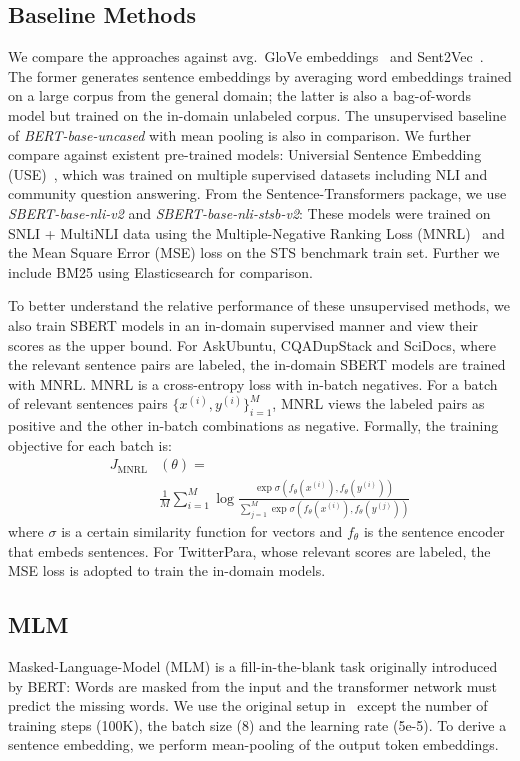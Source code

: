 \documentclass[11pt]{article}
\begin{document}
\subsection{Baseline Methods}
\label{sec:baseline_methods}
We compare the approaches against avg.\ GloVe embeddings~\citep{pennington2014glove} and Sent2Vec~\citep{DBLP:conf/naacl/PagliardiniGJ18}. The former generates sentence embeddings by averaging word embeddings trained on a large corpus from the general domain; the latter is also a bag-of-words model but trained on the in-domain unlabeled corpus. The unsupervised baseline of \textit{BERT-base-uncased} with mean pooling is also in comparison. We further compare against existent pre-trained models: Universial Sentence Embedding (USE)~\citep{DBLP:conf/acl/YangCAGLCAYTSSK20}, which was trained on multiple supervised datasets including NLI and community question answering. From the Sentence-Transformers package, we use \textit{SBERT-base-nli-v2} and \textit{SBERT-base-nli-stsb-v2}: These models were trained on SNLI + MultiNLI data using the Multiple-Negative Ranking Loss (MNRL)~\citep{DBLP:journals/corr/HendersonASSLGK17} and the Mean Square Error (MSE) loss on the STS benchmark train set. Further we include BM25 using Elasticsearch for comparison.

To better understand the relative performance of these unsupervised methods, we also train SBERT models in an in-domain supervised manner and view their scores as the upper bound. For AskUbuntu, CQADupStack and SciDocs, where the relevant sentence pairs are labeled, the in-domain SBERT models are trained with MNRL. MNRL is a cross-entropy loss with in-batch negatives. For a batch of relevant sentences pairs $\{x^{(i)}, y^{(i)}\}_{i=1}^M$, MNRL views the labeled pairs as positive and the other in-batch combinations as negative. Formally, the training objective for each batch is:
\begin{align*}
J_{\mathrm{MNRL}}&(\theta) = \\ &\frac{1}{M}\sum_{i=1}^M\log\frac{\exp{\sigma(f_{\theta}(x^{(i)}), f_{\theta}(y^{(i)}))}}{\sum_{j=1}^M\exp{\sigma(f_{\theta}(x^{(i)}), f_{\theta}(y^{(j)}))}}
\end{align*}where $\sigma$ is a certain similarity function for vectors and $f_{\theta}$ is the sentence encoder that embeds sentences. For TwitterPara, whose relevant scores are labeled, the MSE loss is adopted to train the in-domain models.

\subsection{MLM} 
Masked-Language-Model (MLM) is a fill-in-the-blank task originally introduced by BERT: Words are masked from the input and the transformer network must predict the missing words. We use the original setup in~\citet{DBLP:conf/naacl/DevlinCLT19} except the number of training steps (100K), the batch size (8) and the learning rate (5e-5). To derive a sentence embedding, we perform mean-pooling of the output token embeddings.
\end{document}
